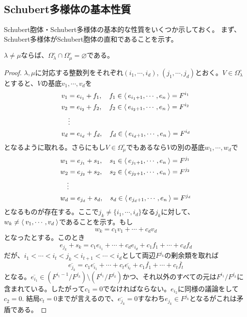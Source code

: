 \documentclass{ltjsreport}
\begin{document}
\subsection{Schubert多様体の基本性質}
Schubert胞体・Schubert多様体の基本的な性質をいくつか示しておく。
まず、Schubert多様体がSchubert胞体の直和であることを示す。

\begin{prop}
  $\lambda\neq\mu$ならば、$\Omega_\lambda^\circ\cap\Omega_\mu^\circ=\varnothing$である。
\end{prop}

\begin{proof}
  $\lambda,\mu$に対応する整数列をそれぞれ$(i_1,\cdots,i_d)$, $(j_1,\cdots,j_d)$とおく。$V\in\Omega_\lambda^\circ$とすると、$V$の基底$v_1,\cdots,v_d$を
  \begin{align*}
    &v_1=e_{i_1}+f_1,\quad f_1\in\langle\:e_{i_1+1},\cdots,e_n\:\rangle=F^{i_1}\\
    &v_2=e_{i_2}+f_2,\quad f_2\in\langle\:e_{i_2+1},\cdots,e_n\:\rangle=F^{i_2}\\
    &\quad\vdots\\
    &v_d=e_{i_d}+f_d,\quad f_d\in\langle\:e_{i_d+1},\cdots,e_n\:\rangle=F^{i_d}
  \end{align*}
  となるように取れる。さらにもし$V\in\Omega_{\mu}^\circ$でもあるなら$V$の別の基底$w_1,\cdots,w_d$で
  \begin{align*}
    &w_1=e_{j_1}+s_1,\quad s_1\in\langle\:e_{j_1+1},\cdots,e_n\:\rangle=F^{j_1}\\
    &w_2=e_{j_2}+s_2,\quad s_2\in\langle\:e_{j_2+1},\cdots,e_n\:\rangle=F^{j_2}\\
    &\quad\vdots\\
    &w_d=e_{j_d}+s_d,\quad s_d\in\langle\:e_{j_d+1},\cdots,e_n\:\rangle=F^{j_d}
  \end{align*}
  となるものが存在する。ここで$j_k\neq\{i_1,\cdots,i_d\}$なる$j_k$に対して、$w_{k}\neq\langle\:v_1,\cdots,v_d\:\rangle$であることを示す。もし
  \[
  w_k=c_1v_1+\cdots+c_dv_d  
  \]
  となったとする。このとき
  \[
  e_{j_k}+s_k=c_1e_{i_1}+\cdots+c_de_{i_d}+c_1f_1+\cdots+c_df_d  
  \]
  だが、$i_1<\cdots<i_{t}<j_k<i_{t+1}<\cdots<i_d$として両辺$F^{j_k}$の剰余類を取れば
  \[
  \overline{e_{j_k}}=c_1\overline{e_{i_1}}+\cdots+c_t\overline{e_{i_t}}+c_1\overline{f_1}+\cdots+c_t\overline{f_t}  
  \]
  となる。$\overline{e_{i_1}}\in (F^{i_1-1}/F^{j_k})\setminus (F^{i_1}/F^{j_k})$かつ、それ以外のすべての元は$F^{i_1}/F^{j_k}$に含まれている。したがって$c_1=0$でなければならない。$e_{i_2}$に同様の議論をして$c_2=0$. 結局$c_t=0$までが言えるので、$\overline{e_{j_k}}=0$すなわち$e_{j_k}\in F^{j_k}$となるがこれは矛盾である。
\end{proof}
\end{document}
